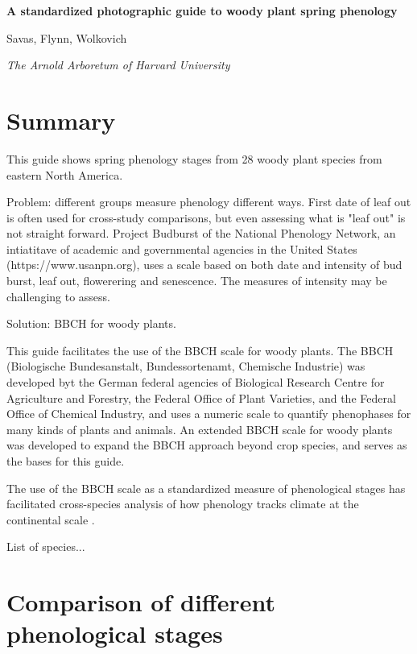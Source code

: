 \documentclass{article}
\begin{document}


\flushleft

\textbf{\huge{A standardized photographic guide to woody plant spring phenology}}

Savas, Flynn, Wolkovich

\textit{The Arnold Arboretum of Harvard University}


\section*{Summary}

This guide shows spring phenology stages from 28 woody plant species from eastern North America.

Problem: different groups measure phenology different ways. First date of leaf out is often used for cross-study comparisons, but even assessing what is "leaf out" is not straight forward. Project Budburst of the National Phenology Network, an intiatitave of academic and governmental agencies in the United States (https://www.usanpn.org), uses a scale based on both date and intensity of bud burst, leaf out, flowerering and senescence. The measures of intensity may be challenging to assess. 

Solution: BBCH for woody plants.

This guide facilitates the use of the BBCH scale for woody plants. The BBCH (Biologische Bundesanstalt, Bundessortenamt, Chemische Industrie) was developed byt the German federal agencies of Biological Research Centre for Agriculture and Forestry, the Federal Office of Plant Varieties, and the Federal Office of Chemical Industry, and uses a numeric scale to quantify phenophases for many kinds of plants and animals. An extended BBCH scale for woody plants \cite{Finn:2007} was developed to expand the BBCH approach beyond crop species, and serves as the bases for this guide.

The use of the BBCH scale as a standardized measure of phenological stages has facilitated cross-species analysis of how phenology tracks climate at the continental scale \cite{Menzel:2006}. 

List of species...

\section*{Comparison of different phenological stages}
\end{document}
